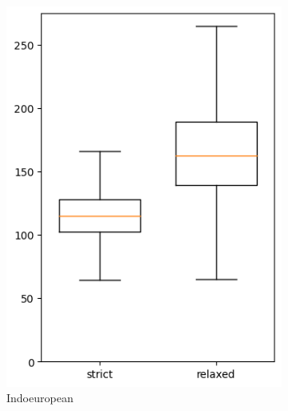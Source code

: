 \documentclass[a4paper,12pt]{scrartcl}
\begin{document}
\begin{figure}
\begin{subfigure}{0.4\textwidth}
    \includegraphics[width=\textwidth]{supplement/analysis/indoeuropean_years_per_split.png}
    \caption{Indoeuropean}
  \end{subfigure}
  \begin{subfigure}{0.4\textwidth}

\end{subfigure}
\end{figure}
\end{document}
